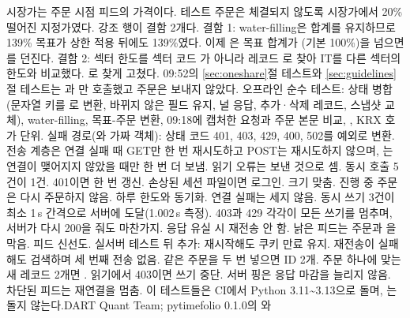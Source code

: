 {{\begin{tabularx}{\linewidth}{>{\RaggedRight\arraybackslash}p{16mm} >{\RaggedRight\arraybackslash}p{25mm} >{\RaggedRight\arraybackslash}p{47mm} >{\RaggedRight\arraybackslash}X}
\end{tabularx}}}{시장가는 주문 시점 피드의 가격이다. 테스트 주문은 체결되지 않도록 시장가에서 20\% 떨어진 지정가였다. 강조 행이 결함 2개다. 결함 1: water-filling은 합계를 유지하므로 139\% 목표가 상한 적용 뒤에도 139\%였다. 이제 은 목표 합계가 (기본 100\%)을 넘으면 를 던진다. 결함 2: 섹터 한도를 섹터 코드 가 아니라  레코드 로 찾아 IT를 다른 섹터의 한도와 비교했다. 로 찾게 고쳤다. 09:52의 \ref{sec:oneshare}절 테스트와 \ref{sec:guidelines}절 테스트는 과 만 호출했고 주문은 보내지 않았다. 오프라인 순수 테스트: 상태 병합(문자열 키를 로 변환, 바뀌지 않은 필드 유지, 널 응답, 추가·삭제 레코드, 스냅샷 교체), water-filling, 목표-주문 변환, 09:18에 캡처한 요청과 주문 본문 비교, , KRX 호가 단위. 실패 경로(와 가짜 객체): 상태 코드 401, 403, 429, 400, 502를 예외로 변환. 전송 계층은 연결 실패 때 GET만 한 번 재시도하고 POST는 재시도하지 않으며, 는 연결이 맺어지지 않았을 때만 한 번 더 보냄. 읽기 오류는 보낸 것으로 셈. 동시  호출 5건이  1건. 401이면 한 번 갱신. 손상된 세션 파일이면 로그인. 크기 맞춤. 진행 중 주문은 다시 주문하지 않음. 하루 한도와 동기화. 연결 실패는 세지 않음. 동시 쓰기 3건이 최소 1\,s 간격으로 서버에 도달(1.002\,s 측정). 403과 429 각각이 모든 쓰기를 멈추며, 서버가 다시 200을 줘도 마찬가지.  응답 유실 시 재전송 안 함. 낡은 피드는 주문과 을 막음. 피드 신선도. 실서버 테스트 뒤 추가: 재시작해도 쿠키 만료 유지. 재전송이 실패해도 검색하며 세 번째 전송 없음. 같은 주문을 두 번 넣으면 ID 2개. 주문 하나에 맞는 새 레코드 2개면 . 읽기에서 403이면 쓰기 중단. 서버 핑은 응답 마감을 늘리지 않음. 차단된 피드는 재연결을 멈춤. 이 테스트들은 CI에서 Python 3.11\textasciitilde 3.13으로 돌며, 는 돌지 않는다.}{DART Quant Team; pytimefolio 0.1.0의 와 }
